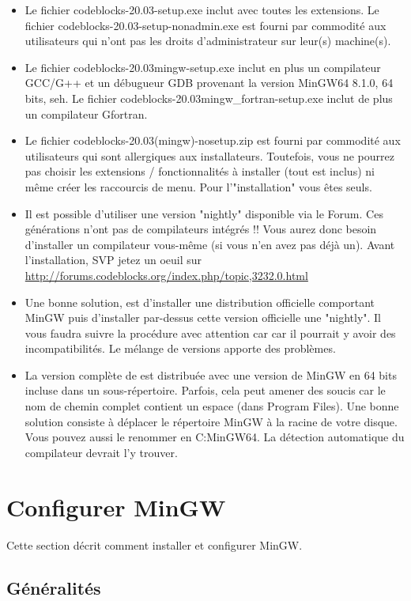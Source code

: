 \begin{itemize}
\item Le fichier codeblocks-20.03-setup.exe inclut \codeblocks avec toutes les extensions. Le fichier codeblocks-20.03-setup-nonadmin.exe est fourni par commodité aux utilisateurs qui n'ont pas les droits d'administrateur sur leur(s) machine(s).
\item Le fichier codeblocks-20.03mingw-setup.exe inclut en plus un compilateur GCC/G++ et un débugueur GDB provenant la version MinGW64 8.1.0, 64 bits, seh. Le fichier codeblocks-20.03mingw\_fortran-setup.exe inclut de plus un compilateur Gfortran.
\item Le fichier codeblocks-20.03(mingw)-nosetup.zip est fourni par commodité aux utilisateurs qui sont allergiques aux installateurs. Toutefois, vous ne pourrez pas choisir les extensions / fonctionnalités à installer (tout est inclus) ni même créer les raccourcis de menu. Pour l'"installation" vous êtes seuls.
\item Il est possible d'utiliser une version "nightly" disponible via le Forum. Ces générations n'ont pas de compilateurs intégrés !! Vous aurez donc besoin d'installer un compilateur vous-même (si vous n'en avez pas déjà un). Avant l'installation, SVP jetez un oeuil sur \url{http://forums.codeblocks.org/index.php/topic,3232.0.html} 
\item Une bonne solution, est d'installer une distribution officielle comportant MinGW puis d'installer par-dessus cette version officielle une "nightly". Il vous faudra suivre la procédure avec attention car car il pourrait y avoir des incompatibilités. Le mélange de versions apporte des problèmes. 
\item La version complète de \codeblocks est distribuée avec une version de MinGW en 64 bits incluse dans un sous-répertoire. Parfois, cela peut amener des soucis car le nom de chemin complet contient un espace (dans Program Files). Une bonne solution consiste à déplacer le répertoire MinGW à la racine de votre disque. Vous pouvez aussi le renommer en C:\osp MinGW64. La détection automatique du compilateur devrait l'y trouver.
\end{itemize}

\section{Configurer MinGW}

Cette section décrit comment installer et configurer MinGW.

\subsection{Généralités}

